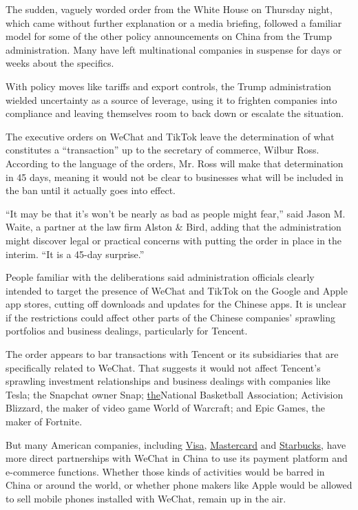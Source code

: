The sudden, vaguely worded order from the White House on Thursday night,
which came without further explanation or a media briefing, followed a
familiar model for some of the other policy announcements on China from
the Trump administration. Many have left multinational companies in
suspense for days or weeks about the specifics.

With policy moves like tariffs and export controls, the Trump
administration wielded uncertainty as a source of leverage, using it to
frighten companies into compliance and leaving themselves room to back
down or escalate the situation.

The executive orders on WeChat and TikTok leave the determination of
what constitutes a ``transaction'' up to the secretary of commerce,
Wilbur Ross. According to the language of the orders, Mr. Ross will make
that determination in 45 days, meaning it would not be clear to
businesses what will be included in the ban until it actually goes into
effect.

``It may be that it's won't be nearly as bad as people might fear,''
said Jason M. Waite, a partner at the law firm Alston \& Bird, adding
that the administration might discover legal or practical concerns with
putting the order in place in the interim. ``It is a 45-day surprise.''

People familiar with the deliberations said administration officials
clearly intended to target the presence of WeChat and TikTok on the
Google and Apple app stores, cutting off downloads and updates for the
Chinese apps. It is unclear if the restrictions could affect other parts
of the Chinese companies' sprawling portfolios and business dealings,
particularly for Tencent.

The order appears to bar transactions with Tencent or its subsidiaries
that are specifically related to WeChat. That suggests it would not
affect Tencent's sprawling investment relationships and business
dealings with companies like Tesla; the Snapchat owner Snap;
\href{https://www.nba.com/article/2019/07/28/nba-tencent-announce-partnership-expansion-release}{the}National
Basketball Association; Activision Blizzard, the maker of video game
World of Warcraft; and Epic Games, the maker of Fortnite.

But many American companies, including
\href{https://usa.visa.com/about-visa/newsroom/press-releases.releaseId.16681.html}{Visa},
\href{https://newsroom.mastercard.com/asia-pacific/press-releases/mastercard-works-with-tencent-and-ant-financial-to-enable-new-payments-choices-across-china-for-international-visitors/}{Mastercard}
and
\href{https://stories.starbucks.com/stories/2016/starbucks-tencent-partnership/}{Starbucks},
have more direct partnerships with WeChat in China to use its payment
platform and e-commerce functions. Whether those kinds of activities
would be barred in China or around the world, or whether phone makers
like Apple would be allowed to sell mobile phones installed with WeChat,
remain up in the air.

